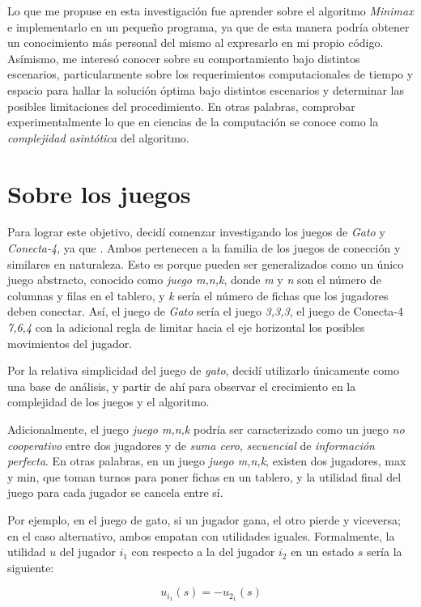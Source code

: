 Lo que me propuse en esta investigación fue aprender sobre el algoritmo \emph{Minimax}
e implementarlo en un pequeño programa, ya que de esta manera podría obtener un conocimiento más personal del mismo al expresarlo en mi propio código. Asímismo, me interesó conocer
sobre su comportamiento bajo distintos escenarios, particularmente sobre los
requerimientos computacionales de tiempo y espacio para hallar la solución
óptima bajo distintos escenarios y determinar las posibles limitaciones del procedimiento. En otras palabras, comprobar experimentalmente lo que en ciencias de la computación se conoce como la  \emph{complejidad asintótica} del algoritmo. 

\clearpage
\section{Sobre los juegos}
Para lograr este objetivo, decidí comenzar investigando los juegos de \emph{Gato} y  \emph{Conecta-4}, ya que . Ambos pertenecen a la familia de los juegos de conección y similares en naturaleza. Esto es porque pueden ser generalizados como un único juego abstracto, conocido como \emph{juego m,n,k}, donde \emph{m} y \emph{n} son el número de columnas y filas en el tablero, y \emph{k} sería el número de fichas que los jugadores deben conectar. Así, el juego de \emph{Gato} sería el juego \emph{3,3,3}, el juego de Conecta-4 \emph{7,6,4} con la adicional regla de limitar hacia el eje horizontal los posibles movimientos del jugador. 

Por la relativa simplicidad del juego de \emph{gato}, decidí utilizarlo únicamente como una base de análisis, y partir de ahí para observar el crecimiento en la complejidad de los juegos y el algoritmo.

Adicionalmente, el juego \emph{juego m,n,k} podría ser caracterizado como un juego \emph{no cooperativo} entre dos jugadores y de \emph{suma cero}, \emph{secuencial} de \emph{información perfecta}. 
En otras palabras, en un juego \emph{juego m,n,k}, existen dos jugadores, max y min, que toman turnos para poner fichas en un tablero, y la utilidad final del juego para cada jugador se cancela entre sí. 

Por ejemplo, en el juego de gato, si un jugador gana, el otro pierde y viceversa; en el caso alternativo, ambos empatan con utilidades iguales. Formalmente, la utilidad  $u$ del jugador $i_{1}$ con respecto a la del jugador $i_{2}$ en un estado $s$ sería la siguiente:

\begin{equation}
u_{i_{1}}(s)=-u_{2_{1}}(s)
\end{equation}

